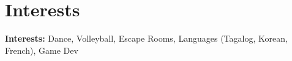 
\section{Interests}
\vspace{-2pt}


\textbf{Interests:} Dance, Volleyball, Escape Rooms, Languages (Tagalog, Korean, French), Game Dev